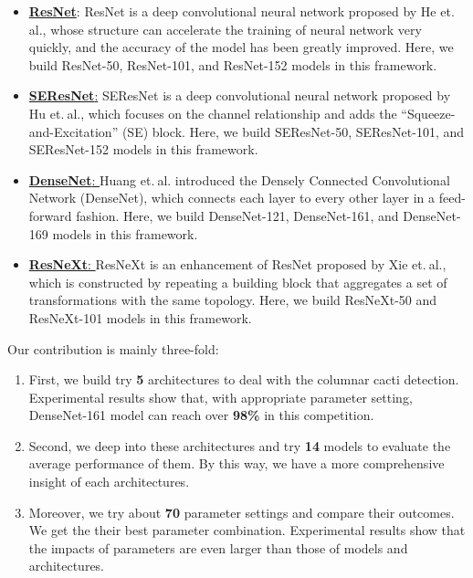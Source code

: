 \documentclass[a4paper]{article}
\begin{document}
{\begin{itemize}
    \item \href{https://arxiv.org/pdf/1512.03385.pdf}{\textbf{ResNet}}: \textsf{ResNet} is a deep convolutional neural network proposed by He et.$\ $al., whose structure can accelerate the training of neural network very quickly, and the accuracy of the model has been greatly improved. Here, we build \textsf{ResNet-50}, \textsf{ResNet-101}, and \textsf{ResNet-152} models in this framework.
    
    \item \href{https://arxiv.org/pdf/1709.01507.pdf}{\textbf{SEResNet}:} \textsf{SEResNet} is a deep convolutional neural network proposed by Hu et.$\ $al., which focuses on the channel relationship and adds the ``Squeeze-and-Excitation'' (SE) block. Here, we build \textsf{SEResNet-50}, \textsf{SEResNet-101}, and \textsf{SEResNet-152} models in this framework.
    
    \item \href{https://arxiv.org/pdf/1608.06993.pdf}{\textbf{DenseNet}: } Huang et.$\ $al. introduced the Densely Connected Convolutional Network (\textsf{DenseNet}), which connects each layer to every other layer in a feed-forward fashion. Here, we build \textsf{DenseNet-121}, \textsf{DenseNet-161}, and \textsf{DenseNet-169} models in this framework.
    
    \item \href{https://arxiv.org/pdf/1611.05431.pdf}{\textbf{ResNeXt}: }  \textsf{ResNeXt} is an enhancement of \textsf{ResNet} proposed by Xie et.$\ $al., which is constructed by repeating a building block that aggregates a set of transformations with the same topology. Here, we build \textsf{ResNeXt-50} and \textsf{ResNeXt-101} models in this framework.
\end{itemize}

Our contribution is mainly three-fold:

\begin{enumerate}
    \item First, we build try \textbf{5} architectures to deal with the columnar cacti detection. Experimental results show that, with appropriate parameter setting, \textsf{DenseNet-161} model can reach over \textbf{98\%} in this competition.
    \item Second, we deep into these architectures and try \textbf{14} models to evaluate the average performance of them. By this way, we have a more comprehensive insight of each architectures.
    \item Moreover, we try about \textbf{70} parameter settings and compare their outcomes. We get the their best parameter combination. Experimental results show that the impacts of parameters are even larger than those of models and architectures.
\end{enumerate}

}
\end{document}
